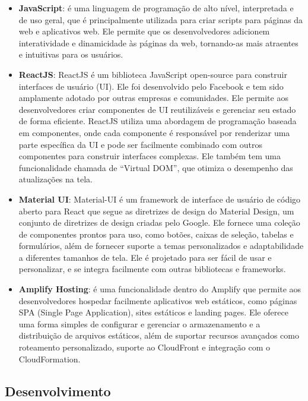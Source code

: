 \begin{itemize} \label{itemize:cliente_production}
    \item \textbf{JavaScript}: é uma linguagem de programação de alto nível, interpretada e de uso geral, que é principalmente utilizada para criar scripts para páginas da web e aplicativos web. Ele permite que os desenvolvedores adicionem interatividade e dinamicidade às páginas da web, tornando-as mais atraentes e intuitivas para os usuários.
    \item \textbf{ReactJS}: ReactJS é um biblioteca JavaScript open-source para construir interfaces de usuário (UI). Ele foi desenvolvido pelo Facebook e tem sido amplamente adotado por outras empresas e comunidades. Ele permite aos desenvolvedores criar componentes de UI reutilizáveis e gerenciar seu estado de forma eficiente. ReactJS utiliza uma abordagem de programação baseada em componentes, onde cada componente é responsável por renderizar uma parte específica da UI e pode ser facilmente combinado com outros componentes para construir interfaces complexas. Ele também tem uma funcionalidade chamada de ``Virtual DOM'', que otimiza o desempenho das atualizações na tela.
    \item \textbf{Material UI}: Material-UI é um framework de interface de usuário de código aberto para React que segue as diretrizes de design do Material Design, um conjunto de diretrizes de design criadas pelo Google. Ele fornece uma coleção de componentes prontos para uso, como botões, caixas de seleção, tabelas e formulários, além de fornecer suporte a temas personalizados e adaptabilidade a diferentes tamanhos de tela. Ele é projetado para ser fácil de usar e personalizar, e se integra facilmente com outras bibliotecas e frameworks.
    \item \textbf{Amplify Hosting}: é uma funcionalidade dentro do Amplify que permite aos desenvolvedores hospedar facilmente aplicativos web estáticos, como páginas SPA (Single Page Application), sites estáticos e landing pages. Ele oferece uma forma simples de configurar e gerenciar o armazenamento e a distribuição de arquivos estáticos, além de suportar recursos avançados como roteamento personalizado, suporte ao CloudFront e integração com o CloudFormation.
\end{itemize}

\subsection{Desenvolvimento}

